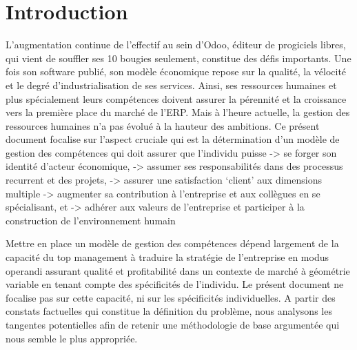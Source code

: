 \chapter*{Introduction}
L’augmentation continue de l’effectif au sein d’Odoo, éditeur de progiciels libres, qui vient de souffler ses 10 bougies seulement, constitue des défis importants. Une fois son software publié, son modèle économique repose sur la qualité, la vélocité et le degré d’industrialisation de ses services. Ainsi, ses ressources humaines et plus spécialement leurs compétences doivent assurer la pérennité et la croissance vers la première place du marché de l'ERP. Mais à l'heure actuelle, la gestion des ressources humaines n'a pas évolué à la hauteur des ambitions. 
Ce présent document focalise sur l’aspect cruciale qui est la détermination d'un modèle de gestion des compétences qui doit assurer que l’individu puisse 
-> se forger son identité d’acteur économique, 
-> assumer ses responsabilités dans des processus recurrent et des projets, 
-> assurer une satisfaction ‘client' aux dimensions multiple
->  augmenter sa contribution à l’entreprise et aux collègues en se spécialisant, et 
-> adhérer aux valeurs de l’entreprise et participer à la construction de l’environnement humain


Mettre en place un modèle de gestion des compétences dépend largement de la capacité du top management à traduire la stratégie de l’entreprise en modus operandi assurant qualité et profitabilité dans un contexte de marché à géométrie variable en tenant compte des spécificités de l’individu. Le présent document ne focalise pas sur cette capacité, ni sur les spécificités individuelles. A partir des constats factuelles qui constitue la définition du problème, nous analysons les tangentes potentielles afin de retenir une méthodologie de base argumentée qui nous semble le plus appropriée.

